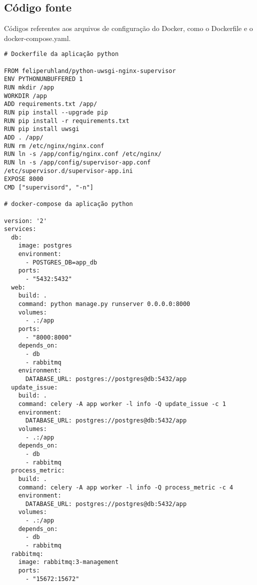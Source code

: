 
\begin{apendicesenv}

\chapter{Código fonte}
Códigos referentes aos arquivos de configuração do Docker, como o Dockerfile e o docker-compose.yaml.

\scriptsize
\begin{lstlisting}
# Dockerfile da aplicação python

FROM feliperuhland/python-uwsgi-nginx-supervisor
ENV PYTHONUNBUFFERED 1
RUN mkdir /app
WORKDIR /app
ADD requirements.txt /app/
RUN pip install --upgrade pip
RUN pip install -r requirements.txt
RUN pip install uwsgi
ADD . /app/
RUN rm /etc/nginx/nginx.conf
RUN ln -s /app/config/nginx.conf /etc/nginx/
RUN ln -s /app/config/supervisor-app.conf /etc/supervisor.d/supervisor-app.ini
EXPOSE 8000
CMD ["supervisord", "-n"]

# docker-compose da aplicação python

version: '2'
services:
  db:
    image: postgres
    environment:
      - POSTGRES_DB=app_db
    ports:
      - "5432:5432"
  web:
    build: .
    command: python manage.py runserver 0.0.0.0:8000
    volumes:
      - .:/app
    ports:
      - "8000:8000"
    depends_on:
      - db
      - rabbitmq
    environment:
      DATABASE_URL: postgres://postgres@db:5432/app
  update_issue:
    build: .
    command: celery -A app worker -l info -Q update_issue -c 1
    environment:
      DATABASE_URL: postgres://postgres@db:5432/app
    volumes:
      - .:/app
    depends_on:
      - db
      - rabbitmq
  process_metric:
    build: .
    command: celery -A app worker -l info -Q process_metric -c 4
    environment:
      DATABASE_URL: postgres://postgres@db:5432/app
    volumes:
      - .:/app
    depends_on:
      - db
      - rabbitmq
  rabbitmq:
    image: rabbitmq:3-management
    ports:
      - "15672:15672"
\end{lstlisting}

\end{apendicesenv}
